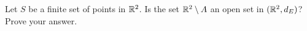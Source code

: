 \begin{comment}

\ExerciseSolution

\ba
\item The answer is yes. Let $a = (x,y)$ in $A$ and let $r = \min\{|x-1|, |x-3|, |y|, |y-1|\}$. If $z = (z_1,z_2) \in B(a,r)$, then 
\[|x-z_1| = \sqrt{(x-z_1)^2} \leq \sqrt{(x-z_1)^2 + (y-z_2)^2} = d_E(a,z) < r\] 
and
\[|y-z_2| = \sqrt{(y-z_1)^2} \leq \sqrt{(x-z_1)^2 + (y-z_2)^2} = d_E(a,z) < r.\]
Since $r \leq |x-1|$ and $r \leq |x-3|$, it follows that $z_1$ is closer to $x$ than either 1 or 3. That is, $1 < z_1 < 3$. Similarly, $r < |y|$ and $r < |y-1|$ implies that $0 < z_2 < 1$. So $B(a,r) \subseteq A$ and $a$ is an interior point of $A$. We conclude that $A$ is an open set. 

\item The answer is yes. Let $a = (x,y)$ in $A$ and let $r = \min\{|x-1|, |x-3|, |y|, |y-1|\}$. If $z = (z_1,z_2) \in B(a,r)$, then 
\[|x-z_1| = \leq |x-z_1| + |y-z_2| = d_T(a,z) < r\] 
and
\[|y-z_2|  \leq |x-z_1| + |y-z_2| = d_T(a,z) < r.\]
Since $r \leq |x-1|$ and $r \leq |x-3|$, it follows that $z_1$ is closer to $x$ than either 1 or 3. That is, $1 < z_1 < 3$. Similarly, $r < |y|$ and $r < |y-1|$ implies that $0 < z_2 < 1$. So $B(a,r) \subseteq A$ and $a$ is an interior point of $A$. We conclude that $A$ is an open set.  

\item The answer is yes. Let $a = (x,y)$ in $A$ and let $r = \min\{|x-1|, |x-3|, |y|, |y-1|\}$. If $z = (z_1,z_2) \in B(a,r)$, then 
\[|x-z_1| = \leq \max\{|x-z_1|, |y-z_2|\} = d_M(a,z) < r\] 
and
\[|y-z_2|  \leq \max\{|x-z_1|, |y-z_2|\} = d_M(a,z) < r.\]
Since $r \leq |x-1|$ and $r \leq |x-3|$, it follows that $z_1$ is closer to $x$ than either 1 or 3. That is, $1 < z_1 < 3$. Similarly, $r < |y|$ and $r < |y-1|$ implies that $0 < z_2 < 1$. So $B(a,r) \subseteq A$ and $a$ is an interior point of $A$. We conclude that $A$ is an open set.  

\ea

\end{comment}


\item Let $S$ be a finite set of points in $\mathbb{R}^2$. Is the set $\mathbb{R}^2 \setminus A$ an open set in $(\mathbb{R}^2, d_E)$? Prove your answer.

\begin{comment}

\ExerciseSolution The answer is yes. Let $S = \{s_1, s_2, \ldots, s_k\}$ for some positive integer $k$. Let $a \in \R^2 \setminus A$ and let $r = \min\{d_E(a,s_1), d_E(a,s_2), \ldots, d_E(a,s_k)\}$. Since $d_E(a,s_i) \geq r$ for each $i$, it follows that $B(a,r) \subseteq \R^2 \setminus S$. So $a$ is an interior point of $\R^2 \setminus S$ and $\R^2 \setminus S$ is an open set.  

\end{comment} 

